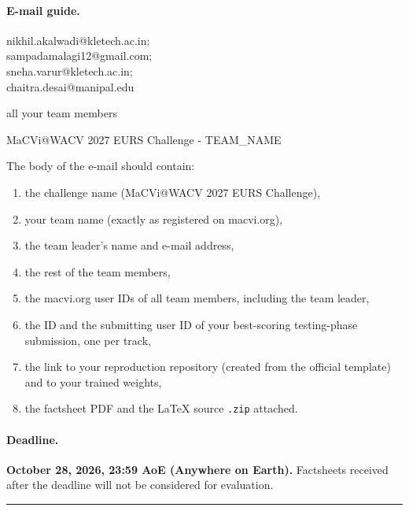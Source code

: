 \documentclass{article}
\begin{document}
{\paragraph{E-mail guide.}
\begin{description}[leftmargin=!,labelwidth=2.2cm]
    \item[To:] nikhil.akalwadi@kletech.ac.in;\\ sampadamalagi12@gmail.com;\\ sneha.varur@kletech.ac.in;\\ chaitra.desai@manipal.edu
    \item[Cc:] all your team members
    \item[Subject:] MaCVi@WACV 2027 EURS Challenge - TEAM\_NAME
\end{description}
The body of the e-mail should contain:
\begin{enumerate}[label=\alph*)]
    \item the challenge name (MaCVi@WACV 2027 EURS Challenge),
    \item your team name (exactly as registered on macvi.org),
    \item the team leader's name and e-mail address,
    \item the rest of the team members,
    \item the macvi.org user IDs of all team members, including the team leader,
    \item the ID and the submitting user ID of your best-scoring testing-phase submission, one per track,
    \item the link to your reproduction repository (created from the official template) and to your trained weights,
    \item the factsheet PDF and the \LaTeX{} source \texttt{.zip} attached.
\end{enumerate}

\paragraph{Deadline.} \textbf{October 28, 2026, 23:59 AoE (Anywhere on Earth).} Factsheets received after the deadline will not be considered for evaluation.

\bigskip\hrule\bigskip
\newpage
}{}

\end{document}
